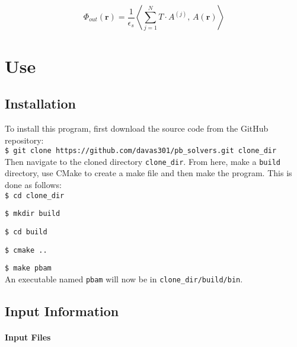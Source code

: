 \[\Phi_{out}(\textbf{r})= \frac{1}{\epsilon_s} \left \langle \sum_{j = 1}^N  T \cdot A^{(j) } , \,  A(\textbf{r})  \right \rangle \]

\clearpage


\chapter{Use}

\section{Installation}

To install this program, first download the source code from the GitHub repository: \\

\hspace{1cm}\texttt{\$ git clone https://github.com/davas301/pb\_solvers.git clone\_dir} \\

Then navigate to the cloned directory \texttt{clone\_dir}. From here, make a \texttt{build} directory, use CMake to create a make file and then make the program.  This is done as follows: \\

\hspace{1cm}\texttt{\$ cd clone\_dir} 

\hspace{1cm}\texttt{\$ mkdir build}

\hspace{1cm}\texttt{\$ cd build}

\hspace{1cm}\texttt{\$ cmake ..} 

\hspace{1cm}\texttt{\$ make pbam} \\

An executable named \texttt{pbam} will now be in \texttt{clone\_dir/build/bin}.

\section{Input Information}

\subsubsection{Input Files}

